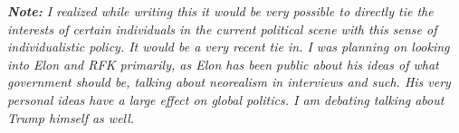 \documentclass{article}
\begin{document}
    \textit{\textbf{Note:} I realized while writing this it would be very possible to directly tie the interests of certain individuals in the current political scene with this sense of individualistic policy. It would be a very recent tie in. I was planning on looking into Elon and RFK primarily, as Elon has been public about his ideas of what government should be, talking about neorealism in interviews and such. His very personal ideas have a large effect on global politics. I am debating talking about Trump himself as well.}
\pagebreak
\printbibliography[
    heading=bibintoc,
    title={\centering Sources}
    ]

    
\end{document}
